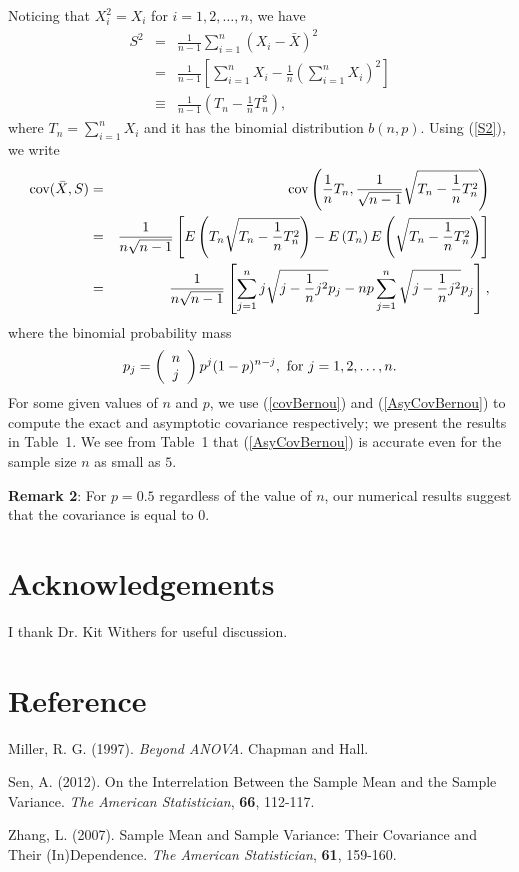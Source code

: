 \documentclass[12pt]{article}
\def\hang{\hangindent\parindent}
\def\re{\par\hang\noindent}
\begin{document}
\noindent
Noticing that $X_i^2=X_i$ for $i=1, 2, \ldots, n$, we have
\begin{eqnarray}
S^2&=&\frac{1}{n-1}\sum_{i=1}^n(X_i-\bar{X})^2 \nonumber \\
   &=&\frac{1}{n-1}\left[\sum_{i=1}^nX_i-\frac{1}{n}\left(\sum_{i=1}^nX_i\right)^2\right] \nonumber \\
   &\equiv& \frac{1}{n-1}\left(T_n - \frac{1}{n}T_n^2\right), \label{S2}
\end{eqnarray}
where $T_n=\sum_{i=1}^nX_i$ and it has the binomial distribution $b(n, p)$. Using (\ref{S2}), we write
\begin{eqnarray}
\hbox{cov}(\bar{X}, S)&=&\hbox{cov}\left(\displaystyle\frac{1}{n}T_n, \frac{1}{\sqrt{n-1}}\sqrt{T_n-\frac{1}{n}T_n^2}\right)\nonumber\\
&=&\displaystyle\frac{1}{n\sqrt{n-1}}\left[E\left(T_n\sqrt{T_n-\frac{1}{n}T_n^2}\right)-E\left(T_n\right)E\left(\sqrt{T_n-\frac{1}{n}T_n^2}\right)\right]\nonumber\\
&=&\displaystyle\frac{1}{n\sqrt{n-1}}\left[\sum_{j=1}^n j\sqrt{j-\frac{1}{n}j^2}p_j-np\sum_{j=1}^n \sqrt{j-\frac{1}{n}j^2}p_j\right],\label{covBernou}
\end{eqnarray}
where the binomial probability mass
$$
p_j=\left(
\begin{array}{c}
n\\
j
\end{array}
\right)p^j(1-p)^{n-j}, \ \hbox{for}\ j=1, 2, \ldots, n.
$$
For some given values of $n$ and $p$, we use (\ref{covBernou}) and (\ref{AsyCovBernou}) to compute the exact and asymptotic covariance respectively; we present the results in Table~1. We see from Table~1 that (\ref{AsyCovBernou}) is accurate even for the sample size $n$ as small as $5$.

\noindent
{\bf Remark 2}: For $p=0.5$ regardless of the value of $n$, our numerical results suggest that the covariance is equal to $0$.




\section*{Acknowledgements} I thank Dr. Kit Withers for useful discussion.

\section*{Reference}

\re{} Miller, R. G. (1997). {\it Beyond ANOVA}. Chapman and
Hall.

\re{} Sen, A. (2012). On the Interrelation Between the Sample Mean and the
Sample Variance. {\it The American
Statistician}, {\bf 66}, 112-117.


\re{} Zhang, L. (2007). Sample Mean and Sample Variance: Their
Covariance and Their (In)Dependence. {\it The American
Statistician}, {\bf 61}, 159-160.


 
\end{document}
